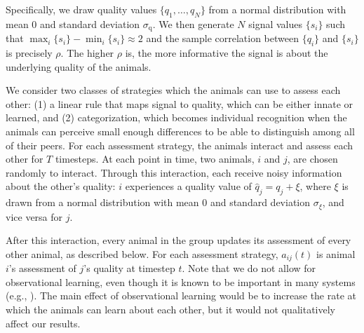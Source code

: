 Specifically, we draw quality values $\{q_1,\dots,q_N\}$ from a normal distribution with mean $0$ and standard deviation $\sigma_\text{q}$. We then generate $N$ signal values $\{s_i\}$ such that 
$\max_i\{s_i\}-\min_i\{s_i\}\approx 2$ and the sample correlation between $\{q_i\}$ and $\{s_i\}$ is precisely $\rho$. 
The higher $\rho$ is, the more informative the signal is about the underlying quality of the animals. 

We consider two classes of strategies which the animals can use to assess each other: (1) a linear rule that maps signal to quality, which can be either innate or learned, and (2) categorization, which becomes individual recognition when the animals can perceive small enough differences to be able to distinguish among all of their peers. For each assessment strategy, the animals interact and assess each other for $T$ timesteps. At each point in time, two animals, $i$ and $j$, are chosen randomly to interact. Through this interaction, each receive noisy information about the other's quality: $i$ experiences a quality value of $\hat{q}_j=q_j+\xi$, where $\xi$ is drawn from a normal distribution with mean $0$ and standard deviation $\sigma_\xi$, and vice versa for $j$. 

After this interaction, every animal in the group updates its assessment of every other animal, as described below. For each assessment strategy, $a_{ij}(t)$ is animal $i$'s assessment of $j$'s quality at timestep $t$. Note that we do not allow for observational learning, even though it is known to be important in many systems (e.g., \citep{Freeman:1985kl,Holekamp:1991nx,Schaik:2011oq,Hobson:2015uq,Seyfarth2015SocialCognition}). The main effect of observational learning would be to increase the rate at which the animals can learn about each other, but it would not qualitatively affect our results. 


